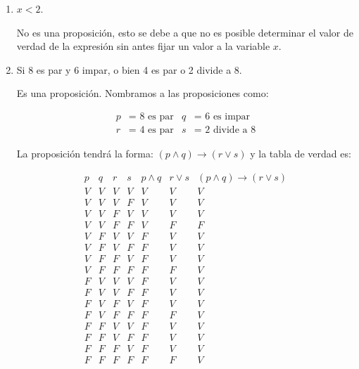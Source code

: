 \begin{enumerate}
	Y la proposici\'on ser\'a verdadera siempre y cuando ambas afirmaciones sean correctas.
	
	\item $x < 2$. 
	
	No es una proposici\'on, esto se debe a que no es posible determinar el valor de verdad de la expresi\'on sin antes fijar un valor a la variable $x$.
	
	\item Si 8 es par y 6 impar, o bien 4 es par o 2 divide a 8.
	
	Es una proposici\'on. Nombramos a las proposiciones como:
	
	\begin{align*}
		p &= \text{ 8 es par} & q &= \text{ 6 es impar}\\
		r &= \text{ 4 es par} & s &= \text{ 2 divide a 8}
	\end{align*}

	La proposici\'on tendr\'a la forma: $(p \wedge q) \rightarrow (r \vee s)$ y la tabla de verdad es:
	
	\begin{displaymath}
		\begin{array}{|c|c|c|c|c|c|c|}
			p & q & r & s & p \wedge q & r \vee s & (p \wedge q) \rightarrow (r \vee s)\\
			\hline 
			V & V & V & V & V & V & V\\
			V & V & V & F & V & V & V\\
			V & V & F & V & V & V & V\\
			V & V & F & F & V & F &	F\\
				
			V & F & V & V & F & V & V\\
			V & F & V & F & F & V & V\\
			V & F & F & V & F & V & V\\
			V & F & F & F & F & F &	V\\	
			
			F & V & V & V & F & V & V\\
			F & V & V & F & F & V & V\\
			F & V & F & V & F & V & V\\
			F & V & F & F & F & F &	V\\
			
			F & F & V & V & F & V & V\\
			F & F & V & F & F & V & V\\
			F & F & F & V & F & V & V\\
			F & F & F & F & F & F &	V\\	
		\end{array}
	\end{displaymath}


\end{enumerate}

